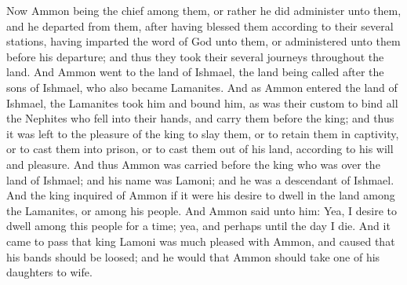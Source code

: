 Now Ammon being the chief among them, or rather he did administer unto them, and he departed from them, after having blessed them according to their several stations, having imparted the word of God unto them, or administered unto them before his departure; and thus they took their several journeys throughout the land.
\bverse \iffalse And Ammon went to the land of Ishmael, the land being called after the sons of Ishmael, who also became Lamanites. \fi
And Ammon went to the land of Ishmael, the land being called after the sons of Ishmael, who also became Lamanites.
\bverse \iffalse And as Ammon entered the land of Ishmael, the Lamanites took him and bound him, as was their custom to bind all the Nephites who fell into their hands, and carry them before the king; and thus it was left to the pleasure of the king to slay them, or to retain them in captivity, or to cast them into prison, or to cast them out of his land, according to his will and pleasure. \fi
And as Ammon entered the land of Ishmael, the Lamanites took him and bound him, as was their custom to bind all the Nephites who fell into their hands, and carry them before the king; and thus it was left to the pleasure of the king to slay them, or to retain them in captivity, or to cast them into prison, or to cast them out of his land, according to his will and pleasure.
\bverse \iffalse And thus Ammon was carried before the king who was over the land of Ishmael; and his name was Lamoni; and he was a descendant of Ishmael. \fi
And thus Ammon was carried before the king who was over the land of Ishmael; and his name was Lamoni; and he was a descendant of Ishmael.
\bverse \iffalse And the king inquired of Ammon if it were his desire to dwell in the land among the Lamanites, or among his people. \fi
And the king inquired of Ammon if it were his desire to dwell in the land among the Lamanites, or among his people.
\bverse \iffalse And Ammon said unto him: Yea, I desire to dwell among this people for a time; yea, and perhaps until the day I die. \fi
And Ammon said unto him: Yea, I desire to dwell among this people for a time; yea, and perhaps until the day I die.
\bverse \iffalse And it came to pass that king Lamoni was much pleased with Ammon, and caused that his bands should be loosed; and he would that Ammon should take one of his daughters to wife. \fi
And it came to pass that king Lamoni was much pleased with Ammon, and caused that his bands should be loosed; and he would that Ammon should take one of his daughters to wife.
